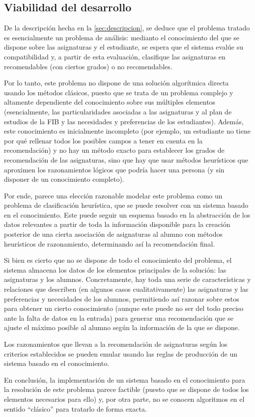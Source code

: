 
\subsection{Viabilidad del desarrollo} \label{sec:viabilidad}

De la descripción hecha en la \autoref{sec:descripcion}, se deduce que el 
problema tratado es esencialmente un problema de análisis: medianto el 
conocimiento del que se dispone sobre las asignaturas y el estudiante, se 
espera que el sistema evalúe su compatibilidad y, a partir de esta evaluación, 
clasifique las asignaturas en recomendables (con ciertos grados) o no 
recomendables.

Por lo tanto, este problema no dispone de una solución algorítmica directa 
usando los métodos clásicos, puesto que se trata de un problema complejo y 
altamente dependiente del conocimiento sobre sus múltiples elementos 
(esencialmente, las particularidades asociadas a las asignaturas y al plan de 
estudios de la FIB y las necesidades y preferencias de los estudiantes). 
Además, este conocimiento es inicialmente incompleto (por ejemplo, un 
estudiante no tiene por qué rellenar todos los posibles campos a tener en 
cuenta en la recomendación) y no hay un método exacto para establecer los 
grados de recomendación de las asignaturas, sino que hay que usar métodos 
heurísticos que aproximen los razonamientos lógicos que podría hacer una 
persona (y sin disponer de un conocimiento completo).

Por ende, parece una elección razonable modelar este problema como un problema 
de clasificación heurística, que se puede resolver con un sistema basado en el 
conocimiento. Este puede seguir un esquema basado en la abstracción de los 
datos relevantes a partir de toda la información disponible para la creación 
posterior de una cierta asociación de asignaturas al alumno con métodos 
heurísticos de razonamiento, determinando así la recomendación final.

Si bien es cierto que no se dispone de todo el conocimiento del problema, el 
sistema almacena los datos de los elementos principales de la solución: las 
asignaturas y los alumnos. Concretamente, hay toda una serie de 
características y relaciones que describen (en algunos casos cualitativamente) 
las asignaturas y las preferencias y necesidades de los alumnos, permitiendo 
así razonar sobre estos para obtener un cierto conocimiento (aunque este puede 
no ser del todo preciso ante la falta de datos en la entrada) para generar 
una recomendación que se ajuste el máximo posible al alumno según la 
información de la que se dispone.

Los razonamientos que llevan a la recomendación de asignaturas según los 
criterios establecidos se pueden emular usando las reglas de producción de 
un sistema basado en el conocimiento.

En conclusión, la implementación de un sistema basado en el conocimiento para 
la resolución de este problema parece factible (puesto que se dispone de todos 
los elementos necesarios para ello) y, por otra parte, no se conocen 
algoritmos en el sentido ``clásico'' para tratarlo de forma exacta.


